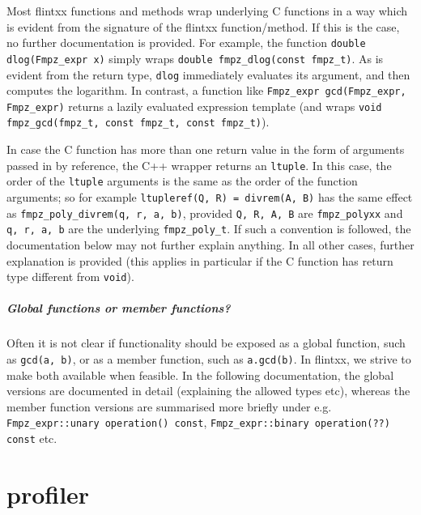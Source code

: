 \documentclass[a4paper,10pt]{book}
\newcommand{\code}{\lstinline}
\begin{document}
{{Most flintxx functions and methods wrap underlying C functions in a way which is
evident from the signature of the flintxx function/method. If this is the case,
no further documentation is provided. For example, the function
\code{double dlog(Fmpz_expr x)} simply wraps
\code{double fmpz_dlog(const fmpz_t)}.  As is
evident from the return type, \code{dlog} immediately evaluates its argument,
and then computes the logarithm. In contrast, a function like
\code{Fmpz_expr gcd(Fmpz_expr, Fmpz_expr)} returns a lazily evaluated expression
template (and wraps \code{void fmpz_gcd(fmpz_t, const fmpz_t, const fmpz_t)}).

In case the C function has more than one return value in the form of arguments
passed in by reference, the C++ wrapper returns an \code{ltuple}. In this case,
the order of the \code{ltuple} arguments is the same as the order of the
function arguments; so for example \code{ltupleref(Q, R) = divrem(A, B)} has the
same effect as \code{fmpz_poly_divrem(q, r, a, b)}, provided \code{Q, R, A, B}
are \code{fmpz_polyxx} and \code{q, r, a, b} are the underlying
\code{fmpz_poly_t}. If such a convention is followed, the documentation below
may not further explain anything. In all other cases, further explanation is
provided (this applies in particular if the C function has return type different
from \code{void}).

\paragraph{Global functions or member functions?} Often it is not clear if
functionality should be exposed as a global function,
such as \code{gcd(a, b)}, or as a member
function, such as \code{a.gcd(b)}. In flintxx, we strive to make both available
when feasible. In the following documentation, the global versions are
documented in detail (explaining the allowed types etc), whereas the member
function versions are summarised more briefly under e.g.
\code{Fmpz_expr::unary operation() const},
\code{Fmpz_expr::binary operation(??) const} etc.




\chapter{profiler}

}}
\end{document}
